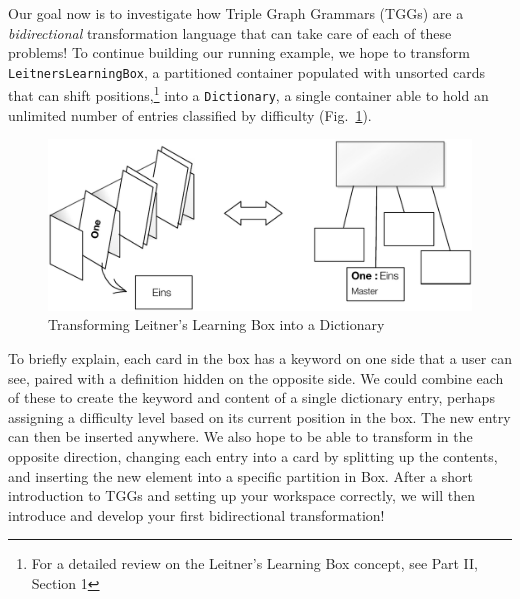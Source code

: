 Our goal now is to investigate how Triple Graph Grammars (TGGs) are a \emph{bidirectional} transformation language that can take care of each of these problems!
To continue building our running example, we hope to transform \texttt{LeitnersLearningBox}, a partitioned container populated with unsorted
cards that can shift positions,\footnote{For a detailed review on the Leitner's Learning Box concept, see Part II, Section 1} into a \texttt{Dictionary}, a
single container able to hold an unlimited number of entries classified by difficulty (Fig.~\ref{fig:transformIdea}). 

\vspace{0.5cm}

\begin{figure}[htbp]
\begin{center}
  \includegraphics[width=\textwidth]{TGGTransformationExample.pdf}
  \caption{Transforming Leitner's Learning Box into a Dictionary}
  \label{fig:transformIdea}
\end{center}
\end{figure}

To briefly explain, each card in the box has a keyword on one side that a user can see, paired with a definition hidden on the opposite side. We could combine
each of these to create the keyword and content of a single dictionary entry, perhaps assigning a difficulty level based on its current position in the
box. The new entry can then be inserted anywhere. We also hope to be able to transform in the opposite direction, changing each
entry into a card by splitting up the contents, and inserting the new element into a specific partition in Box. After a short introduction to TGGs and setting
up your workspace correctly, we will then introduce and develop your first bidirectional transformation!

